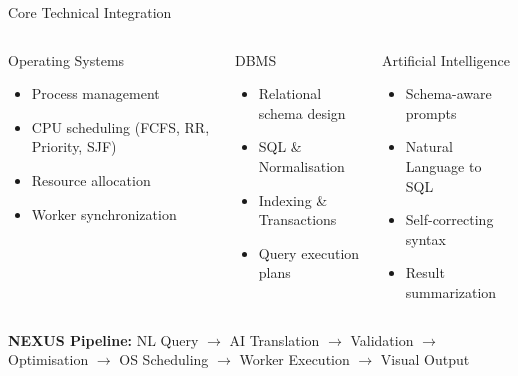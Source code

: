 \documentclass[aspectratio=169,11pt]{beamer}
\begin{document}
\begin{frame}{Core Technical Integration}

\begin{columns}[T,totalwidth=\textwidth]

\begin{block}{Operating Systems}
\scriptsize
\begin{itemize}\itemsep0.5pt
\item[\tiny$\bullet$] Process management
\item[\tiny$\bullet$] CPU scheduling (FCFS, RR, Priority, SJF)
\item[\tiny$\bullet$] Resource allocation
\item[\tiny$\bullet$] Worker synchronization
\end{itemize}
\end{block}

\begin{block}{DBMS}
\scriptsize
\begin{itemize}\itemsep0.5pt
\item[\tiny$\bullet$] Relational schema design
\item[\tiny$\bullet$] SQL \& Normalisation
\item[\tiny$\bullet$] Indexing \& Transactions
\item[\tiny$\bullet$] Query execution plans
\end{itemize}
\end{block}

\begin{block}{Artificial Intelligence}
\scriptsize
\begin{itemize}\itemsep0.5pt
\item[\tiny$\bullet$] Schema-aware prompts
\item[\tiny$\bullet$] Natural Language to SQL
\item[\tiny$\bullet$] Self-correcting syntax
\item[\tiny$\bullet$] Result summarization
\end{itemize}
\end{block}

\end{columns}

\vspace{2mm}

\begin{center}
\colorbox{GEULightBlue}{
\parbox{.88\textwidth}{
\centering\scriptsize
\textbf{NEXUS Pipeline:} NL Query $\rightarrow$ AI Translation $\rightarrow$ Validation $\rightarrow$ Optimisation $\rightarrow$ OS Scheduling $\rightarrow$ Worker Execution $\rightarrow$ Visual Output
}}
\end{center}

\end{frame}
\end{document}
